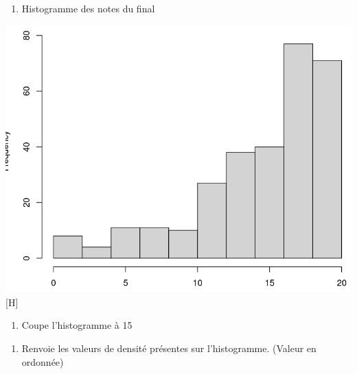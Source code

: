 \documentclass[
]{article}
\newenvironment{Shaded}{}{}
\newcommand{\DataTypeTok}[1]{\textcolor[rgb]{0.56,0.13,0.00}{#1}}
\newcommand{\DecValTok}[1]{\textcolor[rgb]{0.25,0.63,0.44}{#1}}
\newcommand{\KeywordTok}[1]{\textcolor[rgb]{0.00,0.44,0.13}{\textbf{#1}}}
\newcommand{\NormalTok}[1]{#1}
\newcommand{\OperatorTok}[1]{\textcolor[rgb]{0.40,0.40,0.40}{#1}}
\providecommand{\tightlist}{%
  \setlength{\itemsep}{0pt}\setlength{\parskip}{0pt}}
\begin{document}
\begin{enumerate}
\def\labelenumi{\arabic{enumi}.}
\setcounter{enumi}{24}
\tightlist
\item
  Histogramme des notes du final
\end{enumerate}

\begin{Shaded}
\end{Shaded}

\includegraphics{img/hist(final).png}[H]

\begin{enumerate}
\def\labelenumi{\arabic{enumi}.}
\setcounter{enumi}{25}
\tightlist
\item
  Coupe l'histogramme à 15
\end{enumerate}

\begin{Shaded}
\end{Shaded}

\begin{enumerate}
\def\labelenumi{\arabic{enumi}.}
\setcounter{enumi}{26}
\tightlist
\item
  Renvoie les valeurs de densité présentes sur l'histogramme. (Valeur en
  ordonnée)
\end{enumerate}
\end{document}
